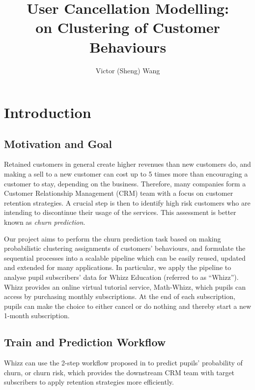 \documentclass[english,a4,oneside,9pt]{extarticle}
\title{User Cancellation Modelling:
\\on Clustering of Customer Behaviours}
\author{Victor (Sheng) Wang}
\begin{document}




\section{Introduction}
\subsection*{Motivation and Goal}


Retained customers in general create higher revenues than new customers do, and making a sell to a new customer can cost up to 5 times more than encouraging a customer to stay, depending on the business. Therefore, many companies form a Customer Relationship Management (CRM) team with a focus on customer retention strategies. A crucial step is then to identify high risk customers who are intending to discontinue their usage of the services. This assessment is better known as \textit{churn prediction}.

Our project aims to perform the churn prediction task based on making probabilistic clustering assignments of customers' behaviours, and formulate the sequential processes into a scalable pipeline which can be easily reused, updated and extended for many applications. In particular, we apply the pipeline to analyse pupil subscribers' data for Whizz Education (referred to as ``Whizz''). Whizz provides an online virtual tutorial service, Math-Whizz, which pupils can access by purchasing monthly subscriptions. At the end of each subscription, pupils can make the choice to either cancel or do nothing and thereby start a new 1-month subscription.

\subsection*{Train and Prediction Workflow}

Whizz can use the 2-step workflow proposed in  to predict pupils' probability of churn, or churn risk, which provides the downstream CRM team with target subscribers to apply retention strategies more efficiently.
\end{document}
